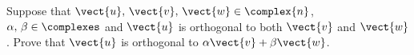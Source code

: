Suppose that $\vect{u},\,\vect{v},\,\vect{w}\in\complex{n}$, $\alpha,\,\beta\in\complexes$ and $\vect{u}$ is orthogonal to both $\vect{v}$ and $\vect{w}$.  Prove that $\vect{u}$ is orthogonal to $\alpha\vect{v}+\beta\vect{w}$.